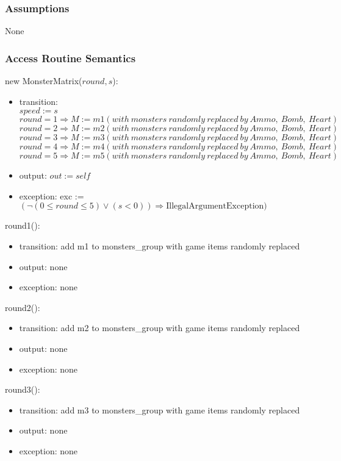 \documentclass[12pt]{article}
\begin{document}
\subsubsection*{Assumptions}
None
\subsubsection*{Access Routine Semantics}
\noindent new MonsterMatrix($\mathit{round}, \mathit{s}$):
\begin{itemize}
\item transition: \\$\mathit{speed} := s$\\
$\mathit{round} = 1 \Rightarrow M := m1(with\ monsters\ randomly\ replaced\ by\ Ammo,\ Bomb,\ Heart)$\\
$\mathit{round} = 2 \Rightarrow M := m2(with\ monsters\ randomly\ replaced\ by\ Ammo,\ Bomb,\ Heart)$\\
$\mathit{round} = 3 \Rightarrow M := m3(with\ monsters\ randomly\ replaced\ by\ Ammo,\ Bomb,\ Heart)$\\
$\mathit{round} = 4 \Rightarrow M := m4(with\ monsters\ randomly\ replaced\ by\ Ammo,\ Bomb,\ Heart)$\\
$\mathit{round} = 5 \Rightarrow M := m5(with\ monsters\ randomly\ replaced\ by\ Ammo,\ Bomb,\ Heart)$
\item output: $out := \mathit{self}$
\item exception: exc := $(\lnot (0 \leq \mathit{round} \leq 5) \vee (\mathit{s} < 0)) \Rightarrow \text{IllegalArgumentException})$
\end{itemize}

\noindent round1():
\begin{itemize}
\item transition: add m1 to monsters\_group with game items randomly replaced
\item output: none
\item exception: none
\end{itemize}

\noindent round2():
\begin{itemize}
\item transition: add m2 to monsters\_group with game items randomly replaced
\item output: none
\item exception: none
\end{itemize}


\noindent round3():
\begin{itemize}
\item transition: add m3 to monsters\_group with game items randomly replaced
\item output: none
\item exception: none
\end{itemize}
\end{document}
